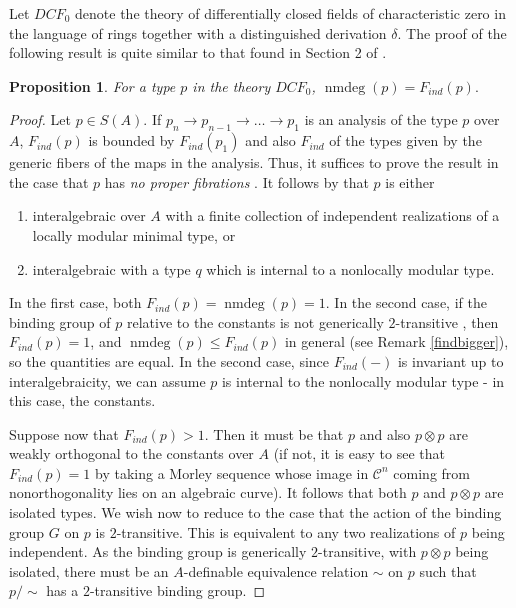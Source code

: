 \documentclass[11pt]{amsart}
\def\nmdeg{\mathop{\rm nmdeg}}
\def\nmdeg{\operatorname{nmdeg}}
\newtheorem{prop}[theorem]{Proposition}
\theoremstyle{definition}
\theoremstyle{remark}
\newcommand{\mc}{\mathcal }
\numberwithin{equation}{section}
\begin{document}
Let $DCF_0$ denote the theory of differentially closed fields of characteristic zero in the language of rings together with a distinguished derivation $\delta$. The proof of the following result is quite similar to that found in Section 2 of \cite{freitag2023degree}.

\begin{prop} \label{dcfsame}
    For a type $p$ in the theory $DCF_0$, $\nmdeg(p) = F_{ind} (p).$
\end{prop}
\begin{proof}
Let $p \in S(A)$. If $p_n \rightarrow p_{n-1} \rightarrow \ldots \rightarrow p_1$ is an analysis of the type $p$ over $A$, $F_{ind} (p)$ is bounded by $F_{ind} (p_1)$ and also $F_{ind}$ of the types given by the generic fibers of the maps in the analysis. Thus, it suffices to prove the result in the case that $p$ has \emph{no proper fibrations} \cite[Definition 2.1]{moosa2014some}. It follows by \cite[Proposition 2.3]{moosa2014some} that $p$ is either 
\begin{enumerate}
    \item interalgebraic over $A$ with a finite collection of independent realizations of a locally modular minimal type, or 
    \item interalgebraic with a type $q$ which is internal to a nonlocally modular type. 
\end{enumerate}
    In the first case, both $F_{ind} (p)= \nmdeg{(p)} =1$. In the second case, if the binding group of $p$ relative to the constants is not generically $2$-transitive \cite[for the defintion of generic transitivity]{freitag2023bounding}, then $F_{ind}(p) = 1$, and $\nmdeg(p) \leq F_{ind} (p) $ in general (see Remark \ref{findbigger}), so the quantities are equal. In the second case, since $F_{ind} (-) $ is invariant up to interalgebraicity, we can assume $p$ is internal to the nonlocally modular type - in this case, the constants. 

    Suppose now that $F_{ind} (p) >1$. Then it must be that $p$ and also $p \otimes p$ are weakly orthogonal to the constants over $A$ (if not, it is easy to see that $F_{ind} (p) =1$ by taking a Morley sequence whose image in $\mc C^n$ coming from nonorthogonality lies on an algebraic curve). It follows that both $p$ and $p \otimes p$ are isolated types. We wish now to reduce to the case that the action of the binding group $G$ on $p$ is $2$-transitive. This is equivalent to any two realizations of $p$ being independent. As the binding group is generically $2$-transitive, with $p \otimes p$ being isolated, there must be an $A$-definable equivalence relation $\sim$ on $p$ such that $p/ \sim$ has a $2$-transitive binding group. 


\end{proof}
\end{document}
